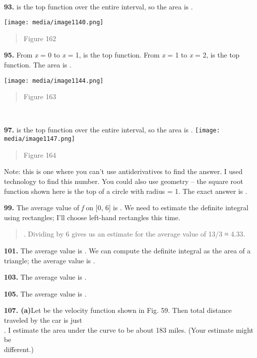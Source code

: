 \textbf{\\
}

\textbf{93.} is the top function over the entire interval, so the area
is .

\texttt{[image: media/image1140.png]}

\begin{quote}
Figure 162
\end{quote}

\textbf{95.} From \emph{x} = 0 to \emph{x} = 1, is the top function.
From \emph{x} = 1 to \emph{x} = 2, is the top function. The area is .

\texttt{[image: media/image1144.png]}

\begin{quote}
Figure 163
\end{quote}

\textbf{\\
}

\textbf{97.} is the top function over the entire interval, so the area
is .
\texttt{[image: media/image1147.png]}

\begin{quote}
Figure 164
\end{quote}

Note: this is one where you can't use antiderivatives to find the
answer. I used technology to find this number. You could also use
geometry -- the square root function shown here is the top of a circle
with radius = 1. The exact answer is .

\textbf{99.} The average value of \emph{f} on {[}0, 6{]} is . We need to
estimate the definite integral using rectangles; I'll choose left-hand
rectangles this time.

\begin{quote}
. Dividing by 6 gives us an estimate for the average value of 13/3 ≈
4.33.
\end{quote}

\textbf{101.} The average value is . We can compute the definite
integral as the area of a triangle; the average value is .

\textbf{103.} The average value is .

\textbf{105.} The average value is .

\textbf{107. (a)}Let be the velocity function shown in Fig. 59. Then
total distance traveled by the car is just\\
. I estimate the area under the curve to be about 183 miles. (Your
estimate might be\\
different.)

